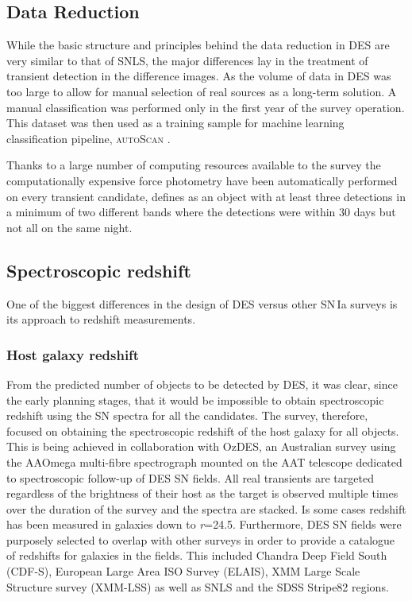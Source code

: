 \subsection{Data Reduction}
While the basic structure and principles behind the data reduction in DES are very similar to that of SNLS, the major differences lay in the treatment of transient detection in the difference images. As the volume of data in DES was too large to allow for manual selection of real sources as a long-term solution. A manual classification was performed only in the first year of the survey operation. This dataset was then used as a training sample for machine learning classification pipeline, \textsc{autoScan} \cite{Goldstein2015}.

Thanks to a large number of computing resources available to the survey the computationally expensive force photometry have been automatically performed on every transient candidate, defines as an object with at least three detections in a minimum of two different bands where the detections were within 30 days but not all on the same night.

\subsection{Spectroscopic redshift}
One of the biggest differences in the design of DES versus other SN\,Ia surveys is its approach to redshift measurements.

\subsubsection{Host galaxy redshift}
From the predicted number of objects to be detected by DES, it was clear, since the early planning stages, that it would be impossible to obtain spectroscopic redshift using the SN spectra for all the candidates. The survey, therefore, focused on obtaining the spectroscopic redshift of the host galaxy for all objects. This is being achieved in collaboration with OzDES, an Australian survey using the AAOmega multi-fibre spectrograph mounted on the AAT telescope dedicated to spectroscopic follow-up of DES SN fields. All real transients are targeted regardless of the brightness of their host as the target is observed multiple times over the duration of the survey and the spectra are stacked. Is some cases redshift has been measured in galaxies down to \textit{r}=24.5. Furthermore, DES SN fields were purposely selected to overlap with other surveys in order to provide a catalogue of redshifts for galaxies in the fields. This included Chandra Deep Field South (CDF-S), European Large Area ISO Survey (ELAIS), XMM Large Scale Structure survey (XMM-LSS) as well as SNLS and the SDSS Stripe82 regions.

